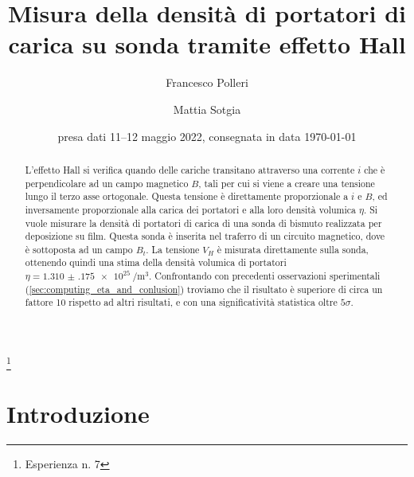 \documentclass[
    prl,
    reprint, 
    superscriptaddress, 
    altaffilletter, 
    amsmath, 
    amssymb, 
    a4paper,
    varvw]{revtex4-2}
\begin{document}
\title{Misura della densità di portatori di carica su sonda tramite effetto Hall
}
\thanks{Esperienza n. 7
}

\author{Francesco Polleri}
\author{Mattia Sotgia}



\date{presa dati
    11--12 maggio 2022, consegnata in data 
    \today
}

\begin{abstract}
    L'effetto Hall si verifica quando delle cariche transitano attraverso una corrente $i$ che è perpendicolare ad un campo magnetico $B$, tali per cui si viene a creare una tensione lungo il terzo asse ortogonale. Questa tensione è direttamente proporzionale a $i$ e $B$, ed inversamente proporzionale alla carica dei portatori e alla loro densità volumica $\eta$.
    Si vuole misurare la densità di portatori di carica di una sonda di bismuto  realizzata per deposizione su film. Questa sonda è inserita nel traferro di un circuito magnetico, dove è sottoposta ad un campo $B_t$. La tensione $V_H$ è misurata direttamente sulla sonda, ottenendo quindi una stima della densità volumica di portatori $\eta=\SI{1.310(175)e+25}{\per\cubic\metre}$. Confrontando con precedenti osservazioni sperimentali (\ref{sec:computing_eta_and_conlusion}) troviamo che il risultato è superiore di circa un fattore 10 rispetto ad altri risultati, e con una significatività statistica oltre $5\sigma$.
\end{abstract}


\maketitle
\thispagestyle{fancy}


\section{Introduzione}
\end{document}
